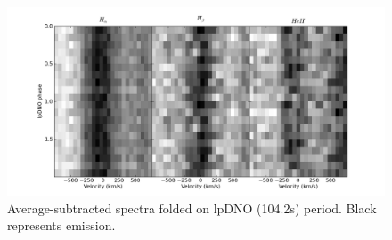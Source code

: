 \begin{figure}[t]
\begin{narrow}{-0.in}{0in}
\centering
 \includegraphics[width=0.7\columnwidth, bb = 0 0 1200 600]{spectroscopy/final/specgram_fold_ave_sub_lpDNO104.2.png}
\end{narrow} 
\caption[Average-subtracted spectra folded on lpDNO period]{Average-subtracted spectra folded on lpDNO (104.2s) period. Black represents emission.}
\label{specgram_fold_ave_sublpDNO}
\end{figure}
 















